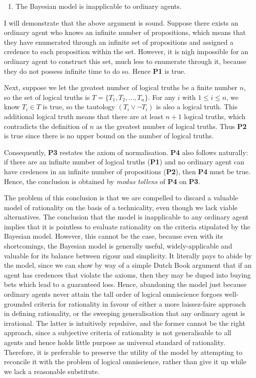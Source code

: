 \documentclass[12pt]{article}
\begin{document}
\begin{enumerate}[resume,label=\textbf{C:}, topsep=0pt, leftmargin=0.5in]
    \item The Bayesian model is inapplicable to ordinary agents.
\end{enumerate}

I will demonstrate that the above argument is sound. Suppose there exists an ordinary agent who knows an infinite number of propositions, which means that they have enumerated through an infinite set of propositions and assigned a credence to each proposition within the set. However, it is nigh impossible for an ordinary agent to construct this set, much less to enumerate through it, because they do not possess infinite time to do so. Hence \textbf{P1} is true.

Next, suppose we let the greatest number of logical truths be a finite number $n$, so the set of logical truths is $T=\{T_1,T_2,\dots,T_n\}$. For any $i$ with $1\leq i\leq n$, we know $T_i\in T$ is true, so the tautology $(T_i\lor\lnot T_i)$ is also a logical truth. This additional logical truth means that there are at least $n+1$ logical truths, which contradicts the definition of $n$ as the greatest number of logical truths. Thus \textbf{P2} is true since there is no upper bound on the number of logical truths.

Consequently, \textbf{P3} restates the axiom of normalisation. \textbf{P4} also follows naturally: if there are an infinite number of logical truths (\textbf{P1}) and no ordinary agent can have credences in an infinite number of propositions (\textbf{P2}), then \textbf{P4} must be true. Hence, the conclusion is obtained by \textit{modus tollens} of \textbf{P4} on \textbf{P3}.

The problem of this conclusion is that we are compelled to discard a valuable model of rationality on the basis of a technicality, even though we lack viable alternatives. The conclusion that the model is inapplicable to any ordinary agent implies that it is pointless to evaluate rationality on the criteria stipulated by the Bayesian model. However, this cannot be the case, because even with its shortcomings, the Bayesian model is generally useful, widely-applicable and valuable for its balance between rigour and simplicity. It literally pays to abide by the model, since we can show by way of a simple Dutch Book argument that if an agent has credences that violate the axioms, then they may be duped into buying bets which lead to a guaranteed loss.\autocite[44]{bdrc} Hence, abandoning the model just because ordinary agents never attain the tall order of logical omniscience forgoes well-grounded criteria for rationality in favour of either a more laissez-faire approach in defining rationality, or the sweeping generalisation that any ordinary agent is irrational. The latter is intuitively repulsive, and the former cannot be the right approach, since a subjective criteria of rationality is not generalisable to all agents and hence holds little purpose as universal standard of rationality. Therefore, it is preferable to preserve the utility of the model by attempting to reconcile it with the problem of logical omniscience, rather than give it up while we lack a reasonable substitute.
\end{document}
